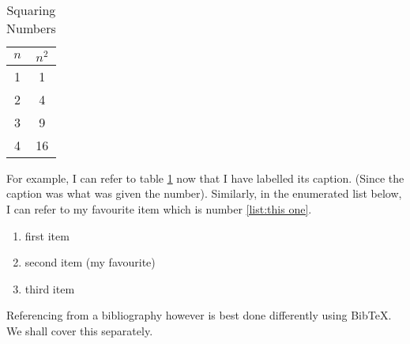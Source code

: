 \documentclass[a4paper,11pt]{article}
\begin{document}
\begin{table}[hbtp]
\centering
\begin{tabular}{c|c}
$n$ & $n^2$ \\
\hline
1 & 1 \\
2 & 4 \\
3 & 9 \\
4 & 16 \\
\end{tabular}
\caption{Squaring Numbers}
\label{tab:squaringnumbers}
\end{table}

For example, I can refer to table \ref{tab:squaringnumbers} now that I have labelled its caption. (Since the caption was what was given the number). Similarly, in the enumerated list below, I can refer to my favourite item which is number  \ref{list:this one}.
\begin{enumerate}
\item first item
\item\label{list:this one} second item (my favourite)
\item third item
\end{enumerate}

Referencing from a bibliography however is best done differently using BibTeX. We shall cover this separately.
\end{document}
